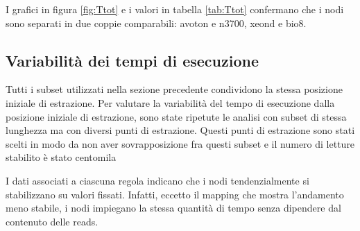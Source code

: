 I grafici in figura \ref{fig:Ttot} e i valori in tabella \ref{tab:Ttot} confermano che i nodi sono separati in due coppie comparabili: avoton e n3700, xeond e bio8.


\subsection{Variabilità dei tempi di esecuzione}
Tutti i subset utilizzati nella sezione precedente condividono la stessa posizione iniziale di estrazione.
Per valutare la variabilità del tempo di esecuzione dalla posizione iniziale di estrazione, sono state ripetute le analisi con subset di stessa lunghezza ma con diversi punti di estrazione.
Questi punti di estrazione sono stati scelti in modo da non aver sovrapposizione fra questi subset e il numero di letture stabilito è stato centomila

\begin{table}[H]
\centering
{}
\caption{Media e deviazione standard, espresse in secondi(s), dei tempi di esecuzione delle regole su diversi subset da centomila reads.}
\label{varT}
\end{table}

I dati associati a ciascuna regola indicano che i nodi tendenzialmente si stabilizzano su valori fissati.
Infatti, eccetto il mapping che mostra l'andamento meno stabile, i nodi impiegano la stessa quantità di tempo senza dipendere dal contenuto delle reads. 


